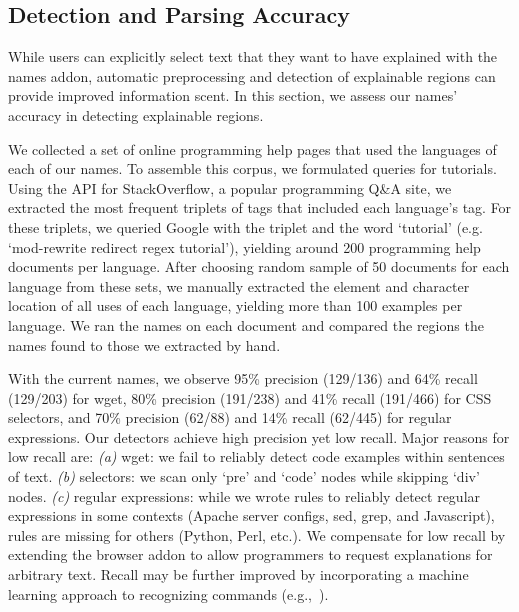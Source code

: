 \subsection{Detection and Parsing Accuracy}
\begin{changes}
While users can explicitly select text that they want to have explained with the \Glspl{name} addon, automatic preprocessing and detection of explainable regions can provide improved information scent.
In this section, we assess our \Glspl{name}' accuracy in detecting explainable regions.

We collected a set of online programming help pages that used the languages of each of our \Glspl{name}.
To assemble this corpus, we formulated queries for tutorials.
Using the API for StackOverflow, a popular programming Q\&A site, we extracted the most frequent triplets of tags that included each language's tag.
For these triplets, we queried Google with the triplet and the word `tutorial' (e.g. `mod-rewrite redirect regex tutorial'), yielding around 200 programming help documents per language. %
After choosing random sample of 50 documents for each language from these sets, 
we manually extracted the element and character location of all uses of each language, yielding more than 100 examples per language.
We ran the \Glspl{name} on each document and compared the regions the \Glspl{name} found to those we extracted by hand.

With the current \Glspl{name}, we observe 95\% precision (129/136) and 64\% recall (129/203) for wget, 80\% precision (191/238) and 41\% recall (191/466) for CSS selectors, and 70\% precision (62/88) and 14\% recall (62/445) for regular expressions.
Our detectors achieve high precision yet low recall.
Major reasons for low recall are:
\emph{(a)} wget: we fail to reliably detect code examples within sentences of text.
\emph{(b)} selectors: we scan only `pre' and `code' nodes while skipping `div' nodes.
\emph{(c)} regular expressions: while we wrote rules to reliably detect regular expressions in some contexts (Apache server configs, sed, grep, and Javascript), rules are missing for others (Python, Perl, etc.).
We compensate for low recall by extending the browser addon to allow programmers to request explanations for arbitrary text.
Recall may be further improved by incorporating a machine learning approach to recognizing commands (e.g.,~\cite{pavel_browsing_2013}).


\end{changes}
